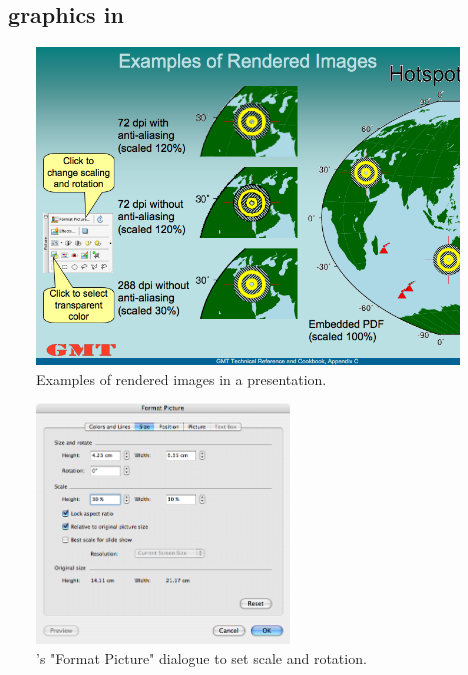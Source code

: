\subsection{\gmt\ graphics in }
\begin{figure}[b]
   \includegraphics[width=\textwidth,bb=0 0 720 540]{ppt/rendering.png}
   \caption{Examples of rendered images in a \protect{} presentation.}
   \label{fig:rendering}
\end{figure}
\begin{figure}[b]
   \centering
   \includegraphics[width=0.6\textwidth,bb=0 0 545 516]{ppt/formatpicture.png}
   \caption{\protect{}'s "Format Picture" dialogue to set scale and rotation.}
   \label{fig:formatpicture}
\end{figure}


